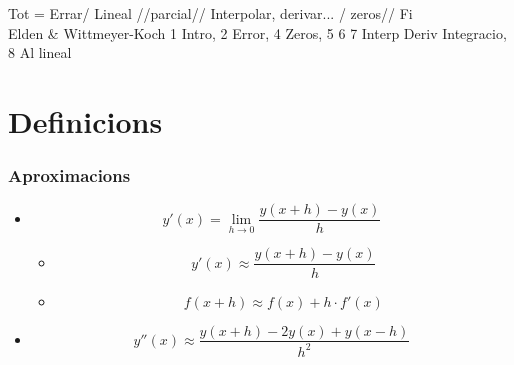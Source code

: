 \documentclass[a4paper,10pt]{article}
\newcommand{\red}[1]{{\color{red}#1}}
\begin{document}
Tot = Errar/ Lineal //parcial// Interpolar, derivar... / zeros// Fi\\
Elden \& Wittmeyer-Koch
1 Intro, 2 Error, 4 Zeros, 5 6 7 Interp Deriv Integracio, 8 Al lineal
\tableofcontents\newpage

\part{\red{D}efinicions}
\section{Aproximacions}
\begin{itemize}
\item $$y'(x) = \lim_{h \to 0} \frac{y(x + h) - y(x)}{h}$$
	\begin{itemize}
	\item $$y'(x) \approx \frac{y(x + h) - y(x)}{h}$$
	\item $$f(x + h) \approx f(x) + h\cdot f'(x)$$
	\end{itemize}
\item $$y''(x) \approx \frac{y(x + h) - 2y(x) + y(x - h)}{h^2}$$
\end{itemize}
\end{document}
